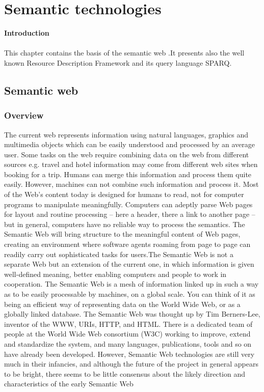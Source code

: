 \documentclass[a4paper,12pt,oneside]{report}
\begin{document}
{\chapter{Semantic technologies}
\textbf{\large Introduction}\\ \\
{This chapter contains the basis of the semantic web .It presents also the well known Resource Description Framework and its query language SPARQ.}
\section{Semantic web}
\label{sec:sem}
\subsection{Overview}
{       The current web represents information using natural languages, graphics and multimedia objects which can be easily understood and processed by an average user. Some tasks on the web require combining data on the web from different sources e.g. travel and hotel information may come from different web sites when booking for a trip. Humans can merge this information and process them quite easily. However, machines can not combine such information and process it. Most of the Web’s content today is designed for humans to read, not for computer programs to manipulate meaningfully. Computers can adeptly parse Web pages for layout and routine processing – here a header, there a link to another page – but in general, computers have no reliable way to process the semantics.
The Semantic Web will bring structure to the meaningful content of Web pages, creating an environment where software agents roaming from page to page can readily carry out sophisticated tasks for users.The Semantic Web is not a separate Web but an extension of the current one, in which information is given well-defined meaning, better enabling computers and people to work in cooperation.
The Semantic Web is a mesh of information linked up in such a way as to be easily processable by machines, on a global scale. You can think of it as being an efficient way of representing data on the World Wide Web, or as a globally linked database.
The Semantic Web was thought up by Tim Berners-Lee, inventor of the WWW, URIs, HTTP, and HTML. There is a dedicated team of people at the World Wide Web consortium (W3C) working to improve, extend and standardize the system, and many languages, publications, tools and so on have already been developed. However, Semantic Web technologies are still very much in their infancies, and although the future of the project in general appears to be bright, there seems to be little consensus about the likely direction and characteristics of the early Semantic Web
}}
\end{document}
